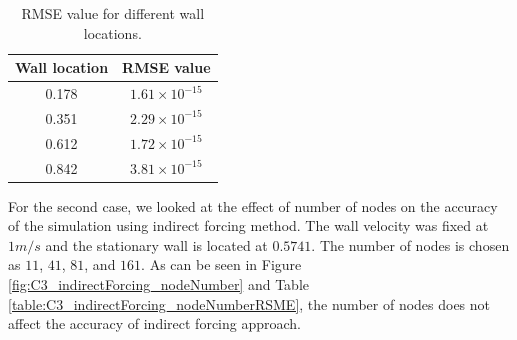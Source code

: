 \begin{table}[H]
\centering
\begin{tabular}{c | c}
	 Wall location & RMSE value \\ \hline \hline
	 0.178 & $1.61 \times 10^{-15}$ \\ \hline
	 0.351 & $2.29 \times 10^{-15}$ \\ \hline
	 0.612 & $1.72 \times 10^{-15}$ \\ \hline
	 0.842 & $3.81 \times 10^{-15}$
\end{tabular}
\caption{RMSE value for different wall locations.}
\label{table:C3_indirectForcing_wallLocationRSME}
\end{table}

For the second case, we looked at the effect of number of nodes on the accuracy of the simulation using indirect forcing method. The wall velocity was fixed at $1 m/s$ and the stationary wall is located at $0.5741$. The number of nodes is chosen as $11$, $41$, $81$, and $161$. As can be seen in Figure \ref{fig:C3_indirectForcing_nodeNumber} and Table \ref{table:C3_indirectForcing_nodeNumberRSME}, the number of nodes does not affect the accuracy of indirect forcing approach.

